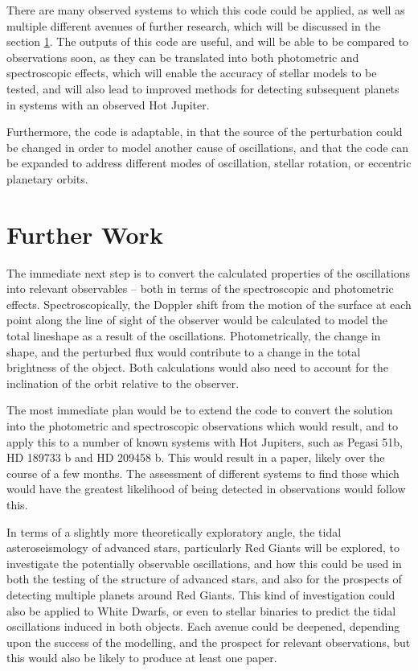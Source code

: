 \documentclass[11pt]{amsart}
\begin{document}
There are many observed systems to which this code could be applied, as well as multiple different avenues of further research, which will be discussed in the section \ref{Future}.  The outputs of this code are useful, and will be able to be compared to observations soon, as they can be translated into both photometric and spectroscopic effects, which will enable the accuracy of stellar models to be tested, and will also lead to improved methods for detecting subsequent planets in systems with an observed Hot Jupiter.

Furthermore, the code is adaptable, in that the source of the perturbation could be changed in order to model another cause of oscillations, and that the code can be expanded to address different modes of oscillation, stellar rotation, or eccentric planetary orbits.







\section{Further Work}   \label{Future}

The immediate next step is to convert the calculated properties of the oscillations into relevant observables -- both in terms of the spectroscopic and photometric effects.  Spectroscopically, the Doppler shift from the motion of the surface at each point along the line of sight of the observer would be calculated to model the total lineshape as a result of the oscillations.  Photometrically, the change in shape, and the perturbed flux would contribute to a change in the total brightness of the object.  Both calculations would also need to account for the inclination of the orbit relative to the observer.  





The most immediate plan would be to extend the code to convert the solution into the photometric and spectroscopic observations which would result, and to apply this to a number of known systems with Hot Jupiters, such as Pegasi 51b, HD 189733 b and HD 209458 b.  This would result in a paper, likely over the course of a few months.  The assessment of different systems to find those which would have the greatest likelihood of being detected in observations would follow this.

In terms of a slightly more theoretically exploratory angle, the tidal asteroseismology of advanced stars, particularly Red Giants will be explored, to investigate the potentially observable oscillations, and how this could be used in both the testing of the structure of advanced stars, and also for the prospects of detecting multiple planets around Red Giants.  This kind of investigation could also be applied to White Dwarfs, or even to stellar binaries to predict the tidal oscillations induced in both objects.  Each avenue could be deepened, depending upon the success of the modelling, and the prospect for relevant observations, but this would also be likely to produce at least one paper.
\end{document}
